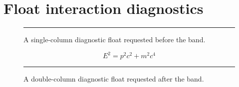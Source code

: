 \documentclass[twocolumn]{article}
\begin{document}
\section{Float interaction diagnostics}
\begin{figure}[t]
\centering\rule{.8\columnwidth}{24mm}
\caption{A single-column diagnostic float requested before the band.}
\end{figure}
\WBTextA
\begin{wideband}
\begin{equation}E^2=p^2c^2+m^2c^4\end{equation}
\end{wideband}
\WBTextB\WBTextC
\begin{figure}[t]
\centering\rule{.8\textwidth}{20mm}
\caption{A double-column diagnostic float requested after the band.}
\end{figure}
\WBTextD\WBTextE\WBTextF
\end{document}
